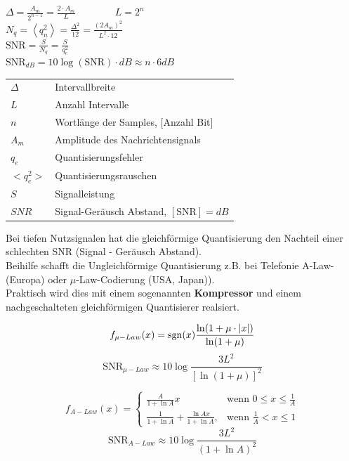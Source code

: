 \begin{multicols}{2}
	$ \Delta = \frac{A_m}{2^{n-1}} = \frac{2 \cdot A_m}{L} \qquad \qquad L = 2^n$\\ 
	$ N_q = \left< q_n^2 \right> = \frac{\Delta^2}{12} =
	\frac{\left(2A_m\right)^2}{L^2 \cdot 12}$\\
	$ \text{SNR} =\frac{S}{N_q}=\frac{S}{q_e^2}$\\
	$\text{SNR}_{dB}=10 \log(\text{SNR}) \cdot dB \approx n \cdot 6dB$
\columnbreak

	\begin{tabular}{>{\boldmath}ll}
		$\Delta$ & Intervallbreite \\
		$L$ & Anzahl Intervalle \\
		$n$ & Wortlänge der Samples, [Anzahl Bit] \\
		$A_m$ & Amplitude des Nachrichtensignals \\
		$q_e$ & Quantisierungsfehler \\
		$<q_e^2>$ & Quantisierungsrauschen \\
		$S$ & Signalleistung\\
		$SNR$ & Signal-Geräusch Abstand, $[\text{SNR}] = dB$
	\end{tabular}
\end{multicols}


Bei tiefen Nutzsignalen hat die gleichförmige Quantisierung den Nachteil einer schlechten SNR
(Signal - Geräusch Abstand). \\
Beihilfe schafft die Ungleichförmige Quantisierung z.B. bei Telefonie
A-Law-(Europa) oder $\mu$-Law-Codierung (USA, Japan)). \\
Praktisch wird dies mit einem sogenannten \textbf{Kompressor} und einem nachgeschalteten
gleichförmigen Quantisierer realsiert.

\begin{minipage}{9cm}
$$ f_{\mu-Law}(x) = \operatorname{sgn}(x) \frac{\ln(1+\mu\cdot|x|)}{\ln(1+\mu)}$$
$$\text{SNR}_{\mu-Law} \approx 10 \log \dfrac{3 L^2}{[\ln(1 + \mu)]^2}$$
\end{minipage}
\begin{minipage}{9cm}
$$f_{A-Law}(x)=\begin{cases} \frac{A}{1+ \ln A} x & \mbox{wenn }0 \le x \le \frac{1}{A} \\
	\frac{1}{1+ \ln A} + \frac{\ln Ax}{1+ \ln A}, & \mbox{wenn } \frac{1}{A} < x \le 1 \end{cases} $$
$$\text{SNR}_{A-Law} \approx 10 \log \dfrac{3 L^2}{(1+\ln A)^2}$$
\end{minipage}


